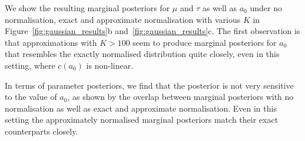 \documentclass[a4paper, notitlepage, 11pt]{article}
\begin{document}
We show the resulting marginal posteriors for $\mu$ and $\tau$ as well as $a_0$ under no normalisation, exact and approximate normalisation with various $K$ in Figure~\ref{fig:gaussian_results}b and~\ref{fig:gaussian_results}c.
The first observation is that approximations with $K > 100$ seem to produce marginal posteriors for $a_0$ that resembles the exactly normalised distribution quite closely, even in this setting, where $c(a_0)$ is non-linear.

In terms of parameter posteriors, we find that the posterior is not very sensitive to the value of $a_0$, as shown by the overlap between marginal posteriors with no normalisation as well as exact and approximate normalisation.
Even in this setting the approximately normalised marginal posteriors match their exact counterparts closely.
\end{document}
